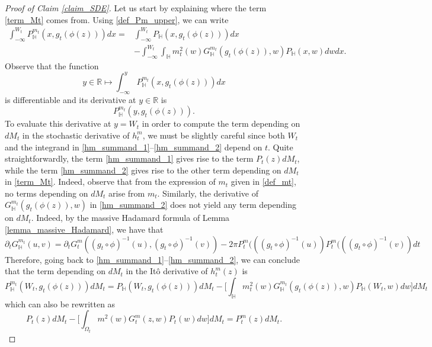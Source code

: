 \documentclass{article}
\newcommand{\HH}{{\mathbb{H}}}
\theoremstyle{definition}
\theoremstyle{remark}
\theoremstyle{remark}
\begin{document}
\begin{proof}[Proof of Claim \ref{claim_SDE}]
Let us start by explaining where the term \eqref{term_Mt} comes from. Using \eqref{def_Pm_upper}, we can write
\begin{align}
    \int_{-\infty}^{W_t} P_{\HH}^{m_t}(x, g_t(\phi(z))) dx = &\int_{-\infty}^{W_t} P_{\HH}(x, g_t(\phi(z))) dx \label{hm_summand_1} \\
    & - \int_{-\infty}^{W_t} \int_{\HH} m_t^2(w) G_{\HH}^{m_t}(g_t(\phi(z)),w) P_{\HH}(x,w) dw dx. \label{hm_summand_2}
\end{align}
Observe that the function
\begin{equation*}
    y \in \mathbb{R} \mapsto \int_{-\infty}^{y} P_{\HH}^{m_t}(x, g_t(\phi(z))) dx
\end{equation*}
is differentiable and its derivative at $y \in \mathbb{R}$ is
\begin{equation*}
    P_{\HH}^{m_t}(y, g_t(\phi(z))).
\end{equation*}
To evaluate this derivative at $y=W_t$ in order to compute the term depending on $dM_t$ in the stochastic derivative of $h_t^m$, we must be slightly careful since both $W_t$ and the integrand in \eqref{hm_summand_1}--\eqref{hm_summand_2} depend on $t$. Quite straightforwardly, the term \eqref{hm_summand_1} gives rise to the term $P_t(z) dM_t$, while the term \eqref{hm_summand_2} gives rise to the other term depending on $dM_t$ in \eqref{term_Mt}. Indeed, observe that from the expression of $m_t$ given in \eqref{def_mt}, no terms depending on $dM_t$ arise from $m_t$. Similarly, the derivative of $G_{\HH}^{m_t}(g_t(\phi(z)),w)$ in \eqref{hm_summand_2} does not yield any term depending on $dM_t$. Indeed, by the massive Hadamard formula of Lemma \ref{lemma_massive_Hadamard}, we have that
\begin{equation*}
    \partial_t G_{\HH}^{m_t}(u,v) = \partial_t G_t^m((g_t \circ \phi)^{-1}(u), (g_t \circ \phi)^{-1}(v)) -2\pi P_t^m(((g_t \circ \phi)^{-1}(u)) P_t^m(((g_t \circ \phi)^{-1}(v)) dt
\end{equation*}
Therefore, going back to \eqref{hm_summand_1}--\eqref{hm_summand_2}, we can conclude that the term depending on $dM_t$ in the It\^o derivative of $h_t^m(z)$ is
\begin{equation*}
    P_{\HH}^{m_t}(W_t, g_t(\phi(z)))dM_t = P_{\HH}(W_t, g_t(\phi(z))) dM_t - \bigg[ \int_{\HH} m_t^2(w) G_{\HH}^{m_t}(g_t(\phi(z)),w) P_{\HH}(W_t,w) dw \bigg] dM_t
\end{equation*}
which can also be rewritten as
\begin{equation*}
    P_{t}(z) dM_t - \bigg[ \int_{\Omega_t} m^2(w) G_{t}^{m}(z,w) P_{t}(w) dw \bigg] dM_t = P_t^m(z) dM_t.

\end{equation*}
\end{proof}
\end{document}
